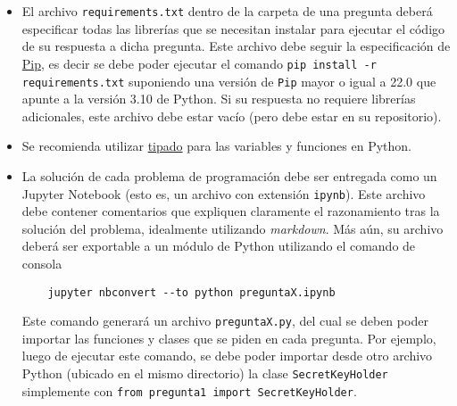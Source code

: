 \begin{itemize}

  \item El archivo \texttt{requirements.txt} dentro de la carpeta de una pregunta deberá especificar todas las librerías que se necesitan instalar para ejecutar el código de su respuesta a dicha pregunta. Este archivo debe seguir la especificación de \href{https://pypi.org/project/pip/}{Pip}, es decir se debe poder ejecutar el comando \texttt{pip install -r requirements.txt} suponiendo una versión de \texttt{Pip} mayor o igual a 22.0 que apunte a la versión 3.10 de Python. Si su respuesta no requiere librerías adicionales, este archivo debe estar vacío (pero debe estar en su repositorio).

  \item Se recomienda utilizar \href{https://docs.python.org/3.10/library/typing.html}{tipado} para las variables y funciones en Python.

\item La solución de cada problema de programación debe ser entregada como un Jupyter Notebook (esto es, un archivo con extensión \texttt{ipynb}). Este archivo debe contener comentarios que expliquen claramente el razonamiento tras la solución del problema, idealmente utilizando \emph{markdown}. Más aún, su archivo deberá ser exportable a un módulo de Python utilizando el comando de consola
\begin{verbatim}
    jupyter nbconvert --to python preguntaX.ipynb
\end{verbatim}
Este comando generará un archivo \texttt{preguntaX.py}, del cual se deben poder importar las funciones y clases que se piden en cada pregunta. Por ejemplo, luego de ejecutar este comando, se debe poder importar desde otro archivo Python (ubicado en el mismo directorio) la clase \texttt{SecretKeyHolder} simplemente con \texttt{from pregunta1 import SecretKeyHolder}.


\end{itemize}
